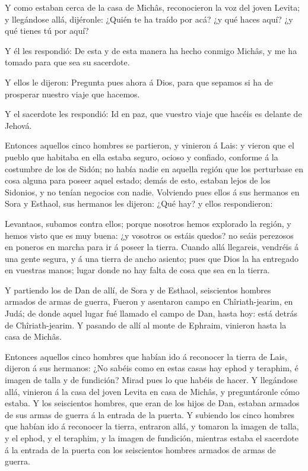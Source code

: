  Y como estaban cerca de la casa de Michâs, reconocieron la
voz del joven Levita; y llegándose allá, dijéronle: ¿Quién te ha traído
por acá? ¿y qué haces aquí? ¿y qué tienes tú por aquí?

 Y él les respondió: De esta y de esta manera ha hecho
conmigo Michâs, y me ha tomado para que sea su sacerdote.

 Y ellos le dijeron: Pregunta pues ahora á Dios, para que
sepamos si ha de prosperar nuestro viaje que hacemos.

 Y el sacerdote les respondió: Id en paz, que vuestro viaje
que hacéis es delante de Jehová.

 Entonces aquellos cinco hombres se partieron, y vinieron á
Lais: y vieron que el pueblo que habitaba en ella estaba seguro, ocioso
y confiado, conforme á la costumbre de los de Sidón; no había nadie en
aquella región que los perturbase en cosa alguna para poseer aquel
estado; demás de esto, estaban lejos de los Sidonios, y no tenían
negocios con nadie.  Volviendo pues ellos á sus hermanos en
Sora y Esthaol, sus hermanos les dijeron: ¿Qué hay? y ellos
respondieron:

 Levantaos, subamos contra ellos; porque nosotros hemos
explorado la región, y hemos visto que es muy buena: ¿y vosotros os
estáis quedos? no seáis perezosos en poneros en marcha para ir á poseer
la tierra.  Cuando allá llegareis, vendréis á una gente
segura, y á una tierra de ancho asiento; pues que Dios la ha entregado
en vuestras manos; lugar donde no hay falta de cosa que sea en la
tierra.

 Y partiendo los de Dan de allí, de Sora y de Esthaol,
seiscientos hombres armados de armas de guerra,  Fueron y
asentaron campo en Chîriath-jearim, en Judá; de donde aquel lugar fué
llamado el campo de Dan, hasta hoy: está detrás de Chîriath-jearim.
 Y pasando de allí al monte de Ephraim, vinieron hasta la
casa de Michâs.

 Entonces aquellos cinco hombres que habían ido á reconocer
la tierra de Lais, dijeron á sus hermanos: ¿No sabéis como en estas
casas hay ephod y teraphim, é imagen de talla y de fundición? Mirad pues
lo que habéis de hacer.  Y llegándose allá, vinieron á la
casa del joven Levita en casa de Michâs, y preguntáronle cómo estaba.
 Y los seiscientos hombres, que eran de los hijos de Dan,
estaban armados de sus armas de guerra á la entrada de la puerta.
 Y subiendo los cinco hombres que habían ido á reconocer la
tierra, entraron allá, y tomaron la imagen de talla, y el ephod, y el
teraphim, y la imagen de fundición, mientras estaba el sacerdote á la
entrada de la puerta con los seiscientos hombres armados de armas de
guerra.


